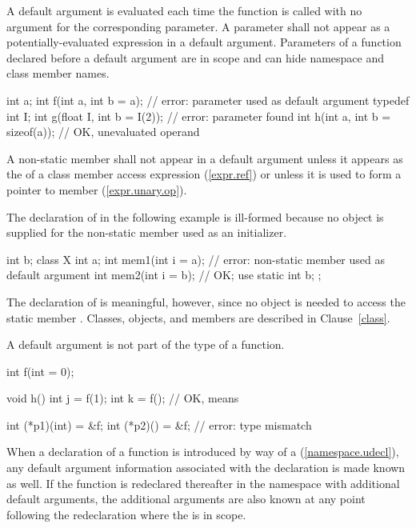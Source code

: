 \pnum
{}%
A default argument is evaluated each time the function is called
with no argument for the corresponding parameter.
%
A parameter shall not appear as a potentially-evaluated expression
in a default argument.
%
Parameters of a function declared before a default argument
are in scope and can hide namespace and class member names.
\begin{example}
\begin{codeblock}
int a;
int f(int a, int b = a);            // error: parameter  used as default argument
typedef int I;
int g(float I, int b = I(2));       // error: parameter  found
int h(int a, int b = sizeof(a));    // OK, unevaluated operand
\end{codeblock}
\end{example}
A non-static member shall not appear in a default argument unless it appears as
the  of a class member access expression (\ref{expr.ref}) or
unless it is used to form a pointer to member (\ref{expr.unary.op}).
\begin{example}
The declaration of
in the following example is ill-formed because no object is supplied for the
non-static member
used as an initializer.
\begin{codeblock}
int b;
class X {
  int a;
  int mem1(int i = a);              // error: non-static member  used as default argument
  int mem2(int i = b);              // OK;  use 
  static int b;
};
\end{codeblock}
The declaration of
is meaningful, however, since no object is needed to access the static member
.
Classes, objects, and members are described in Clause~\ref{class}.
\end{example}
A default argument is not part of the
type of a function.
\begin{example}
\begin{codeblock}
int f(int = 0);

void h() {
  int j = f(1);
  int k = f();                      // OK, means 
}

int (*p1)(int) = &f;
int (*p2)() = &f;                   // error: type mismatch
\end{codeblock}
\end{example}
When a declaration of a function is introduced by way of a
(\ref{namespace.udecl}), any default argument information associated
with the declaration is made known as well.
If the function is redeclared
thereafter in the namespace with additional default arguments,
the additional arguments are also known at any point following
the redeclaration where the
is in scope.

